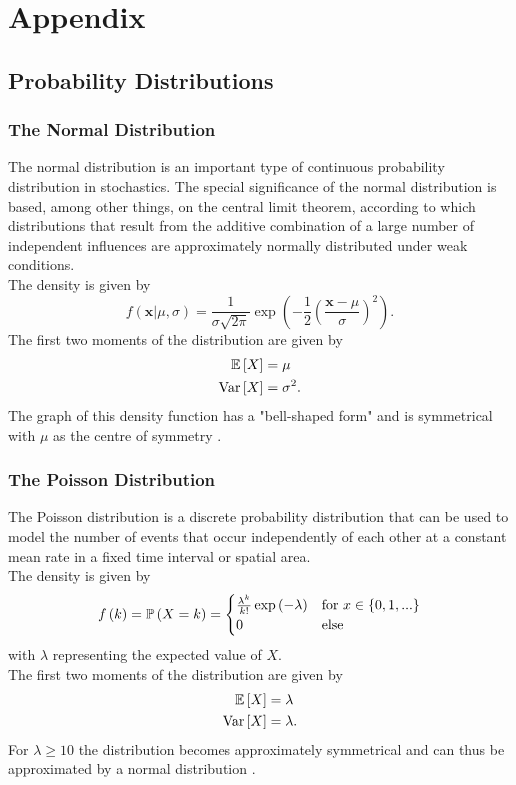 %
\chapter{Appendix}
\label{sec:appendix}
\section{Probability Distributions}
\subsection{The Normal Distribution}
The normal distribution is an important type of continuous probability distribution in stochastics. The special significance of the normal distribution is based, among other things, on the central limit theorem, according to which distributions that result from the additive combination of a large number of independent influences are approximately normally distributed under weak conditions. \\
The density is given by
\begin{equation}
    f\left(\pmb{x}|\mu,\sigma\right)=\frac{1}{\sigma\sqrt{2\pi}}\exp\left(-\frac{1}{2}\left(\frac{\pmb{x}-\mu}{\sigma}\right)^2\right).
\end{equation}
The first two moments of the distribution are given by
\begin{align}
    \mathbb{E}\left[X\right] &= \mu \\
    \hbox{Var}\left[X\right] &= \sigma^2.
\end{align}
The graph of this density function has a "bell-shaped form" and is symmetrical with $\mu$ as the centre of symmetry \autocite[][83-85]{fahrmeir2016statistik}.
\subsection{The Poisson Distribution}
The Poisson distribution is a discrete probability distribution that can be used to model the number of events that occur independently of each other at a constant mean rate in a fixed time interval or spatial area. \\
The density is given by
\begin{equation}
    f\left(k\right)=\mathbb{P}\left(X=k\right)=\begin{cases}
    \frac{\lambda^k}{k!}\exp\left(-\lambda\right) & \hbox{for }x\in\left\lbrace0,1,...\right\rbrace \\
    0 & \hbox{else}
    \end{cases}
\end{equation}
with $\lambda$ representing the expected value of $X$.  \\
The first two moments of the distribution are given by
\begin{align}
    \mathbb{E}\left[X\right] &= \lambda \label{eq:poisson_exp}\\
    \hbox{Var}\left[X\right] &= \lambda \label{eq:poisson_var}.
\end{align}
For $\lambda\geq10$ the distribution becomes approximately symmetrical and can thus be approximated by a normal distribution \autocite[][243]{fahrmeir2016statistik}.
